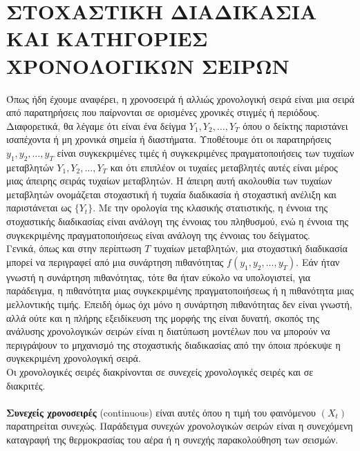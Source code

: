 \section{ΣΤΟΧΑΣΤΙΚΗ ΔΙΑΔΙΚΑΣΙΑ ΚΑΙ ΚΑΤΗΓΟΡΙΕΣ ΧΡΟΝΟΛΟΓΙΚΩΝ ΣΕΙΡΩΝ}
Όπως ήδη έχουμε αναφέρει, η χρονοσειρά ή αλλιώς χρονολογική σειρά είναι μια σειρά από παρατηρήσεις που
παίρνονται σε ορισμένες χρονικές στιγμές ή περιόδους. Διαφορετικά, θα λέγαμε ότι 
είναι ένα δείγμα $ Y_1,Y_2,\ldots,Y_T $
όπου ο δείκτης παριστάνει ισαπέχοντα ή μη χρονικά
σημεία ή διαστήματα. Υποθέτουμε ότι οι παρατηρήσεις $ y_1,y_2,\ldots,y_T$
είναι
συγκεκριμένες τιμές ή συγκεκριμένες πραγματοποιήσεις των τυχαίων μεταβλητών $ Y_1,Y_2,\ldots,Y_T $
και ότι επιπλέον οι τυχαίες μεταβλητές αυτές
είναι μέρος
μιας άπειρης σειράς τυχαίων μεταβλητών. Η άπειρη αυτή ακολουθία των τυχαίων
μεταβλητών ονομάζεται στοχαστική ή τυχαία διαδικασία ή στοχαστική ανέλιξη και
παριστάνεται ως $ \{Y_t\}$.
 Με την ορολογία της κλασικής στατιστικής, η έννοια της
στοχαστικής διαδικασίας είναι ανάλογη της έννοιας του πληθυσμού, ενώ η έννοια της
συγκεκριμένης πραγματοποιήσεως είναι ανάλογη της έννοιας του δείγματος.\\

Γενικά, όπως και στην περίπτωση $T$ τυχαίων μεταβλητών, μια στοχαστική
διαδικασία μπορεί να περιγραφεί από μια συνάρτηση πιθανότητας $ f\left(y_1,y_2,\ldots,y_T\right). $
Εάν ήταν γνωστή η συνάρτηση πιθανότητας, τότε θα ήταν εύκολο να υπολογιστεί, για
παράδειγμα, η πιθανότητα μιας συγκεκριμένης πραγματοποιήσεως ή η πιθανότητα
μιας μελλοντικής τιμής. Επειδή όμως όχι μόνο η συνάρτηση πιθανότητας δεν είναι
γνωστή, αλλά ούτε και η πλήρης εξειδίκευση της μορφής της είναι δυνατή, σκοπός
της ανάλυσης χρονολογικών σειρών είναι η διατύπωση μοντέλων που να μπορούν να
περιγράψουν το μηχανισμό της στοχαστικής διαδικασίας από την όποια πρόεκυψε η
συγκεκριμένη χρονολογική σειρά.\\

Οι χρονολογικές σειρές διακρίνονται σε συνεχείς χρονολογικές σειρές και σε
διακριτές.\\\\
\textbf{ Συνεχείς  χρονοσειρές} (continuous) είναι αυτές όπου η τιμή του
φαινόμενου $ \left(X_t\right)$
παρατηρείται συνεχώς. Παράδειγμα συνεχών χρονολογικών σειρών
είναι η συνεχόμενη καταγραφή της θερμοκρασίας του αέρα ή η συνεχής
παρακολούθηση των σεισμών.\\

